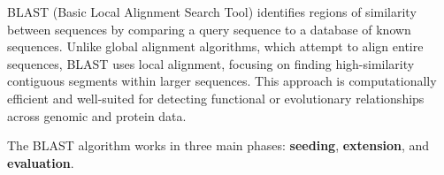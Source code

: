 BLAST (Basic Local Alignment Search Tool)
identifies regions of similarity between sequences by comparing a query sequence to a database of known sequences. Unlike global alignment algorithms, which attempt to align entire sequences, BLAST uses local alignment, focusing on finding high-similarity contiguous segments within larger sequences. This approach is computationally efficient and well-suited for detecting functional or evolutionary relationships across genomic and protein data.

The BLAST algorithm works in three main phases: \textbf{seeding}, \textbf{extension}, and \textbf{evaluation}.

